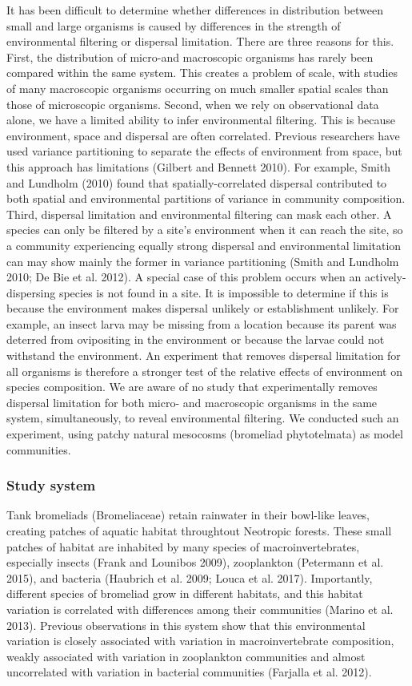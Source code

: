 \documentclass[12pt,]{article}
\begin{document}
It has been difficult to determine whether differences in distribution
between small and large organisms is caused by differences in the
strength of environmental filtering or dispersal limitation. There are
three reasons for this. First, the distribution of micro-and macroscopic
organisms has rarely been compared within the same system. This creates
a problem of scale, with studies of many macroscopic organisms occurring
on much smaller spatial scales than those of microscopic organisms.
Second, when we rely on observational data alone, we have a limited
ability to infer environmental filtering. This is because environment,
space and dispersal are often correlated. Previous researchers have used
variance partitioning to separate the effects of environment from space,
but this approach has limitations (Gilbert and Bennett 2010). For
example, Smith and Lundholm (2010) found that spatially-correlated
dispersal contributed to both spatial and environmental partitions of
variance in community composition. Third, dispersal limitation and
environmental filtering can mask each other. A species can only be
filtered by a site's environment when it can reach the site, so a
community experiencing equally strong dispersal and environmental
limitation can may show mainly the former in variance partitioning
(Smith and Lundholm 2010; De Bie et al. 2012). A special case of this
problem occurs when an actively-dispersing species is not found in a
site. It is impossible to determine if this is because the environment
makes dispersal unlikely or establishment unlikely. For example, an
insect larva may be missing from a location because its parent was
deterred from ovipositing in the environment or because the larvae could
not withstand the environment. An experiment that removes dispersal
limitation for all organisms is therefore a stronger test of the
relative effects of environment on species composition. We are aware of
no study that experimentally removes dispersal limitation for both
micro- and macroscopic organisms in the same system, simultaneously, to
reveal environmental filtering. We conducted such an experiment, using
patchy natural mesocosms (bromeliad phytotelmata) as model communities.

\subsubsection{Study system}\label{study-system}

Tank bromeliads (Bromeliaceae) retain rainwater in their bowl-like
leaves, creating patches of aquatic habitat throughtout Neotropic
forests. These small patches of habitat are inhabited by many species of
macroinvertebrates, especially insects (Frank and Lounibos 2009),
zooplankton (Petermann et al. 2015), and bacteria (Haubrich et al. 2009;
Louca et al. 2017). Importantly, different species of bromeliad grow in
different habitats, and this habitat variation is correlated with
differences among their communities (Marino et al. 2013). Previous
observations in this system show that this environmental variation is
closely associated with variation in macroinvertebrate composition,
weakly associated with variation in zooplankton communities and almost
uncorrelated with variation in bacterial communities (Farjalla et al.
2012).
\end{document}
